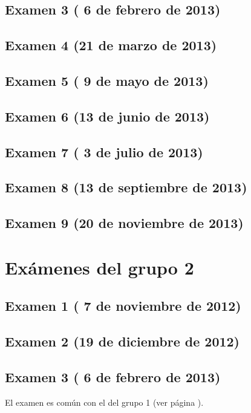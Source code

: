 \documentclass[a4paper,12pt,twoside]{book}
\begin{document}
\section{Examen 3 ( 6 de febrero de 2013)}
\label{examen_12_13_1_3}
\section{Examen 4 (21 de marzo de 2013)}
\section{Examen 5 ( 9 de mayo de 2013)}
\section{Examen 6 (13 de junio de 2013)} 
\section{Examen 7 ( 3 de julio de 2013)} 
\label{examen_12_13_1_7}
\section{Examen 8 (13 de septiembre de 2013)} 
\label{examen_12_13_1_8}
\section{Examen 9 (20 de noviembre de 2013)} 
\label{examen_12_13_1_9}

\chapter{Exámenes del grupo 2}
\section{Examen 1 ( 7 de noviembre de 2012)}
\section{Examen 2 (19 de diciembre de 2012)}
\section{Examen 3 ( 6 de febrero de 2013)}
El examen es común con el del grupo 1 (ver página \pageref{examen_12_13_1_3}).
\end{document}
